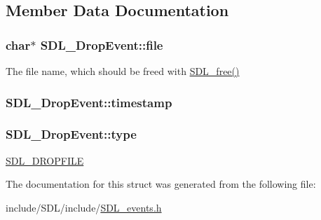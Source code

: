 \subsection{Member Data Documentation}
\hypertarget{struct_s_d_l___drop_event_abc41ef4beb62e1d8b56827128b29585f}{
\subsubsection[{file}]{\setlength{\rightskip}{0pt plus 5cm}char$\ast$ S\-D\-L\-\_\-\-Drop\-Event\-::file}}\label{struct_s_d_l___drop_event_abc41ef4beb62e1d8b56827128b29585f}
The file name, which should be freed with \hyperlink{_s_d_l__stdinc_8h_a0e4ade894d550ada1fa19dc2d46e88b8}{S\-D\-L\-\_\-free()} \hypertarget{struct_s_d_l___drop_event_a02d2c81bb22db632a40cd0021ff751ab}{
\subsubsection[{timestamp}]{ S\-D\-L\-\_\-\-Drop\-Event\-::timestamp}}\label{struct_s_d_l___drop_event_a02d2c81bb22db632a40cd0021ff751ab}
\hypertarget{struct_s_d_l___drop_event_a5ea27cfaa5f8d4940e9a69b68b3cc035}{
\subsubsection[{type}]{ S\-D\-L\-\_\-\-Drop\-Event\-::type}}\label{struct_s_d_l___drop_event_a5ea27cfaa5f8d4940e9a69b68b3cc035}
\hyperlink{_s_d_l__events_8h_a3b589e89be6b35c02e0dd34a55f3fccaad9238862d7aeaebff88be6453ee0fbab}{S\-D\-L\-\_\-\-D\-R\-O\-P\-F\-I\-L\-E} 

The documentation for this struct was generated from the following file\-:\begin{DoxyCompactItemize}
\item 
include/\-S\-D\-L/include/\hyperlink{_s_d_l__events_8h}{S\-D\-L\-\_\-events.\-h}\end{DoxyCompactItemize}
